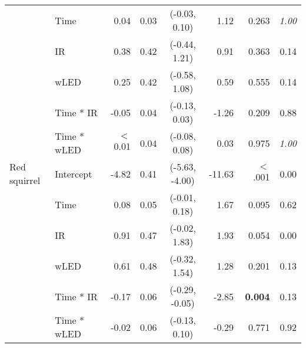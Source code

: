 {{\begin{tabular}[c]{llrlcrrr}
& Time & 0.04 & 0.03 & (-0.03,  0.10) & 1.12 & 0.263  & \textit{1.00} \\ 
& IR & 0.38 & 0.42 & (-0.44,  1.21) & 0.91 & 0.363  & 0.14 \\ 
& wLED & 0.25 & 0.42 & (-0.58,  1.08) & 0.59 & 0.555  & 0.14 \\ 
& Time * IR & -0.05 & 0.04 & (-0.13,  0.03) & -1.26 & 0.209  & 0.88 \\ 
& Time * wLED & $<$ 0.01 & 0.04 & (-0.08,  0.08) & 0.03 & 0.975  & \textit{1.00} \\ 
\midrule
Red squirrel & Intercept & -4.82 & 0.41 & (-5.63, -4.00) & -11.63 & $<$ .001 & 0.00 \\ 
& Time & 0.08 & 0.05 & (-0.01,  0.18) & 1.67 & 0.095  & 0.62 \\ 
& IR & 0.91 & 0.47 & (-0.02,  1.83) & 1.93 & 0.054  & 0.00 \\ 
& wLED & 0.61 & 0.48 & (-0.32,  1.54) & 1.28 & 0.201  & 0.13 \\ 
& Time * IR & -0.17 & 0.06 & (-0.29, -0.05) & -2.85 & \textbf{0.004}  & 0.13 \\ 
& Time * wLED & -0.02 & 0.06 & (-0.13,  0.10) & -0.29 & 0.771  & 0.92 \\ 
   \bottomrule
\end{tabular}}}

